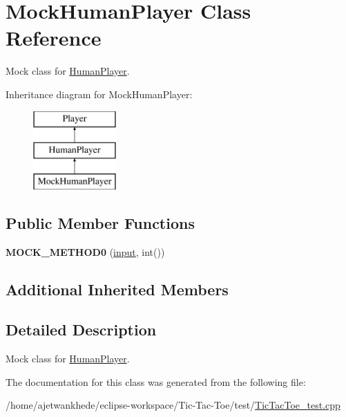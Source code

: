 \hypertarget{classMockHumanPlayer}{}\section{Mock\+Human\+Player Class Reference}
\label{classMockHumanPlayer}


Mock class for \mbox{\hyperlink{classHumanPlayer}{Human\+Player}}.  


Inheritance diagram for Mock\+Human\+Player\+:\begin{figure}[H]
\begin{center}
\leavevmode
\includegraphics[height=3.000000cm]{classMockHumanPlayer}
\end{center}
\end{figure}
\subsection*{Public Member Functions}
\begin{DoxyCompactItemize}
\item 
\mbox{\label{classMockHumanPlayer_a281cd3d9952cdba48ee355f85c28c09e}} 
{\bfseries M\+O\+C\+K\+\_\+\+M\+E\+T\+H\+O\+D0} (\mbox{\hyperlink{classHumanPlayer_a8281fe260b25edc4451fd15ae182707f}{input}}, int())
\end{DoxyCompactItemize}
\subsection*{Additional Inherited Members}


\subsection{Detailed Description}
Mock class for \mbox{\hyperlink{classHumanPlayer}{Human\+Player}}. 

The documentation for this class was generated from the following file\+:\begin{DoxyCompactItemize}
\item 
/home/ajetwankhede/eclipse-\/workspace/\+Tic-\/\+Tac-\/\+Toe/test/\mbox{\hyperlink{TicTacToe__test_8cpp}{Tic\+Tac\+Toe\+\_\+test.\+cpp}}\end{DoxyCompactItemize}
